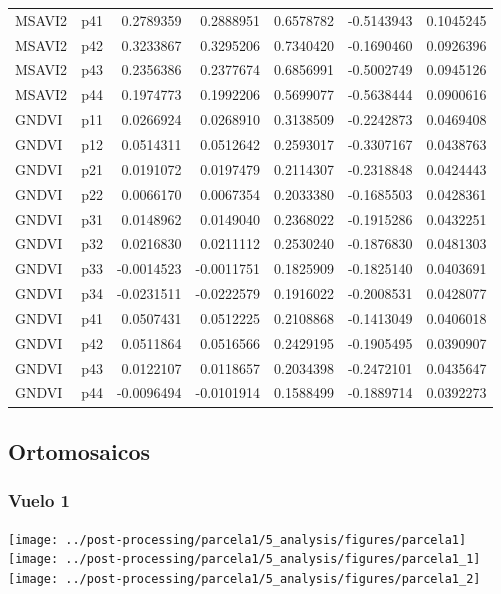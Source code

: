 \documentclass[spanish,openany]{article}
\begin{document}
\begin{table}[!h]
\begin{tabular}[t]{llrrrrr}
\addlinespace
MSAVI2 & p41 & 0.2789359 & 0.2888951 & 0.6578782 & -0.5143943 & 0.1045245\\
MSAVI2 & p42 & 0.3233867 & 0.3295206 & 0.7340420 & -0.1690460 & 0.0926396\\
MSAVI2 & p43 & 0.2356386 & 0.2377674 & 0.6856991 & -0.5002749 & 0.0945126\\
MSAVI2 & p44 & 0.1974773 & 0.1992206 & 0.5699077 & -0.5638444 & 0.0900616\\
GNDVI & p11 & 0.0266924 & 0.0268910 & 0.3138509 & -0.2242873 & 0.0469408\\
\addlinespace
GNDVI & p12 & 0.0514311 & 0.0512642 & 0.2593017 & -0.3307167 & 0.0438763\\
GNDVI & p21 & 0.0191072 & 0.0197479 & 0.2114307 & -0.2318848 & 0.0424443\\
GNDVI & p22 & 0.0066170 & 0.0067354 & 0.2033380 & -0.1685503 & 0.0428361\\
GNDVI & p31 & 0.0148962 & 0.0149040 & 0.2368022 & -0.1915286 & 0.0432251\\
GNDVI & p32 & 0.0216830 & 0.0211112 & 0.2530240 & -0.1876830 & 0.0481303\\
\addlinespace
GNDVI & p33 & -0.0014523 & -0.0011751 & 0.1825909 & -0.1825140 & 0.0403691\\
GNDVI & p34 & -0.0231511 & -0.0222579 & 0.1916022 & -0.2008531 & 0.0428077\\
GNDVI & p41 & 0.0507431 & 0.0512225 & 0.2108868 & -0.1413049 & 0.0406018\\
GNDVI & p42 & 0.0511864 & 0.0516566 & 0.2429195 & -0.1905495 & 0.0390907\\
GNDVI & p43 & 0.0122107 & 0.0118657 & 0.2034398 & -0.2472101 & 0.0435647\\
GNDVI & p44 & -0.0096494 & -0.0101914 & 0.1588499 & -0.1889714 & 0.0392273\\
\bottomrule
\end{tabular}
\end{table}

\subsection{Ortomosaicos}\label{ortomosaicos}

\subsubsection{Vuelo 1}\label{vuelo-1}

\texttt{[image: ../post-processing/parcela1/5\_analysis/figures/parcela1]}
\texttt{[image: ../post-processing/parcela1/5\_analysis/figures/parcela1\_1]}
\texttt{[image: ../post-processing/parcela1/5\_analysis/figures/parcela1\_2]}
\end{document}
